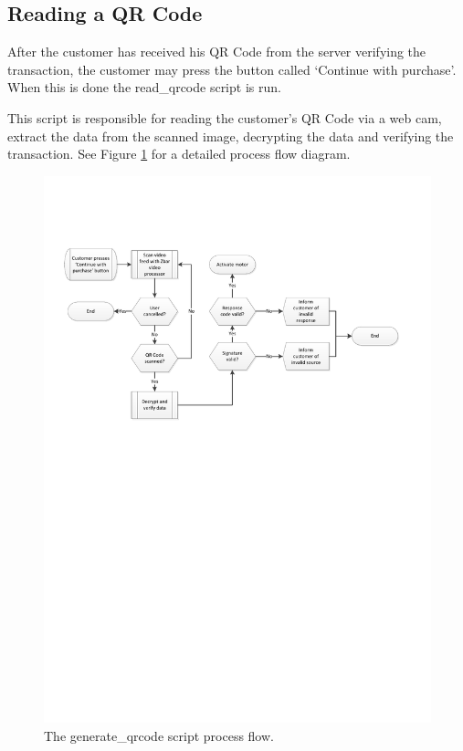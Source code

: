 \subsection{Reading a QR Code}

After the customer has received his QR Code from the server verifying the
transaction, the customer may press the button called `Continue with purchase'.
When this is done the read\_qrcode script is run.

This script is responsible for reading the customer's QR Code via a web cam,
extract the data from the scanned image, decrypting the data and verifying the
transaction. See Figure \ref{fig:read-qrcode-processflow} for a detailed process
flow diagram.

\begin{figure}
 \centering 
 \includegraphics[clip=true, trim
 = 0 460 0 100, scale=0.75]{read_qrcode_processflow}
 \caption{The generate\_qrcode script process flow.}
 \label{fig:read-qrcode-processflow}
\end{figure}

